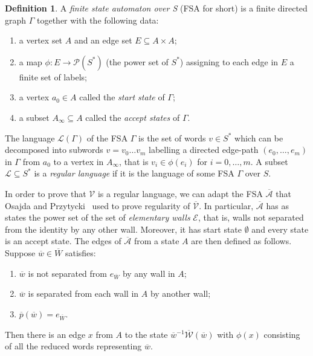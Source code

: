 \documentclass[A4paper, oneside]{amsart}
\newcommand{\id}{\textit{e}}
\newcommand{\W}{\mathcal{W}}
\newcommand{\A}{\mathcal{A}}
\newcommand{\V}{\mathcal{V}}
\newcommand{\LL}{\mathcal{L}}
\theoremstyle{definition}
\newtheorem{defi}[thm]{Definition}
\begin{document}
 \begin{defi}
 	A \emph{finite state automaton over S} (FSA for short) is a finite directed graph $\Gamma$ together with the following data:
 	\begin{enumerate}
 		\item a vertex set $A$ and an edge set $E \subseteq A \times A$;
 		\item a map $\phi : E \to \mathcal{P}(S^*)$ (the power set of $S^*$) assigning to each edge in $E$ a finite set of labels;
 		\item a vertex $a_0 \in A$ called the \emph{start state} of $\Gamma$;
 		\item a subset $A_{\infty} \subseteq A$ called the \emph{accept states} of $\Gamma$.
 	\end{enumerate}
 	The language $\LL(\Gamma)$ of the FSA $\Gamma$ is the set of words $v \in S^*$ which can be decomposed into subwords $v = v_0\ldots v_m$ labelling a directed edge-path $(e_0,\ldots,e_m)$ in $\Gamma$ from $a_0$ to a vertex in $A_{\infty}$, that is $v_i \in \phi(e_i)$ for $i=0,\ldots,m$. A subset $\mathcal{L} \subseteq S^*$ is a \emph{regular language} if it is the language of some FSA $\Gamma$ over $S$.
 \end{defi}
 
 In order to prove that $\V$ is a regular language, we can adapt the FSA $\overline{\A}$ that Osajda and Przytycki~\cite[Definition 6.2]{OP22} used to prove regularity of $\overline{\V}$. In particular, $\overline{\A}$ has as states the power set of the set of \emph{elementary walls} $\mathcal{E}$, that is, walls not separated from the identity by any other wall. Moreover, it has start state $\emptyset$ and every state is an accept state. The edges of $\overline{\A}$ from a state $A$ are then defined as follows. Suppose $\overline{w} \in \overline{W}$ satisfies:
 \begin{enumerate}
 	\item \label{FSA1} $\overline{w}$ is not separated from $\id_{\overline{W}}$ by any wall in $A$;
 	
 	\item \label{FSA2} $\overline{w}$ is separated from each wall in $A$ by another wall;
 	
 	\item \label{FSA3} $\overline{p}(\overline{w}) = \id_{\overline{W}}$.
 \end{enumerate}
 Then there is an edge $x$ from $A$ to the state $\overline{w}^{-1}\overline{\W}(\overline{w})$ with $\phi(x)$ consisting of all the reduced words representing $\overline{w}$.
 
\end{document}
